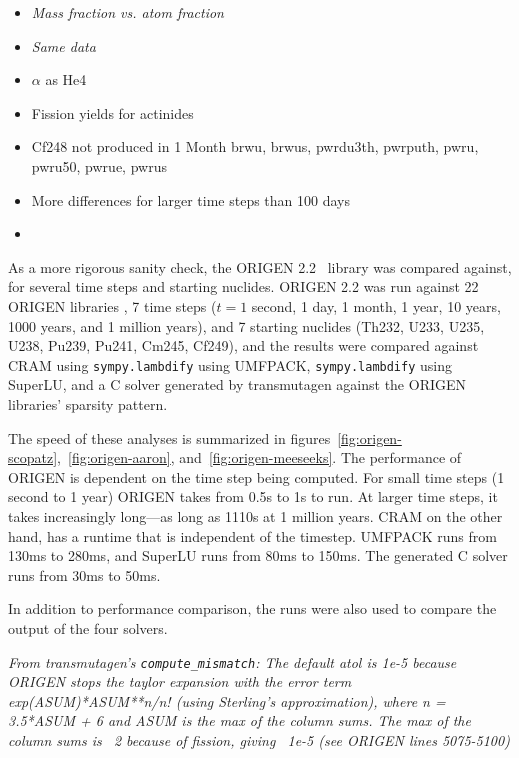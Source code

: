 \begin{itemize}
\item \it{Mass fraction vs. atom fraction}
\item {\it Same data}
\item $\alpha$ as He4
\item Fission yields for actinides
\item Cf248 not produced in 1 Month brwu, brwus, pwrdu3th, pwrputh, pwru,
  pwru50, pwrue, pwrus
\item More differences for larger time steps than 100 days
\item {}
\end{itemize}

As a more rigorous sanity check, the ORIGEN 2.2~\cite{ationneeded} library was
compared against, for several time steps and starting nuclides. ORIGEN 2.2 was
run against 22 ORIGEN libraries , 7 time steps
($t= 1$ second, 1 day, 1 month, 1 year, 10 years, 1000 years, and 1 million
years), and 7 starting nuclides (Th232, U233, U235, U238, Pu239, Pu241, Cm245,
Cf249), and the results were compared against CRAM using
\texttt{sympy.\allowbreak{}lambdify} using UMFPACK,
\texttt{sympy.\allowbreak{}lambdify} using SuperLU, and a C solver generated
by transmutagen against the ORIGEN libraries' sparsity pattern.

 The speed of these analyses is summarized in
figures~\ref{fig:origen-scopatz},~\ref{fig:origen-aaron},
and~\ref{fig:origen-meeseeks}. The performance of ORIGEN is dependent on the
time step being computed. For small time steps (1 second to 1 year) ORIGEN
takes from 0.5\;s to 1\;s to run. At larger time steps, it takes increasingly
long---as long as 1110\;s at 1 million years. CRAM on the other hand, has a
runtime that is independent of the timestep. UMFPACK runs from 130\;ms to
280\;ms, and SuperLU runs from 80\;ms to 150\;ms. The generated C solver runs
from 30\;ms to 50\;ms. 

In addition to performance comparison, the runs were also used to compare the
output of the four solvers.

\it{From transmutagen's \texttt{compute\_mismatch}:}
The default atol is 1e-5 because ORIGEN stops the taylor expansion with
the error term exp(ASUM)*ASUM**n/n! (using Sterling's approximation),
where n = 3.5*ASUM + 6 and ASUM is the max of the column sums. The max of
the column sums is ~2 because of fission, giving ~1e-5 (see ORIGEN lines
5075-5100)

